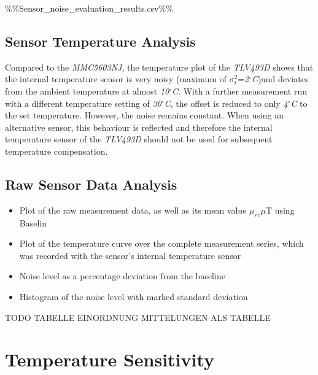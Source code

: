 \%\%Sensor\_noise\_evaluation\_results.csv\%\%

\hypertarget{sensor-temperature-analysis}{%
\subsection{Sensor Temperature
Analysis}\label{sensor-temperature-analysis}}

Compared to the \emph{MMC5603NJ}, the temperature plot of the
\emph{TLV493D} shows that the internal temperature sensor is very noisy
(maximum of \(\sigma^2_{t}\)=\emph{2\(^{\circ}\)C})and deviates from the
ambient temperature at almost \emph{10\(^{\circ}\)C}. With a further
measurement run with a different temperature setting of
\emph{30\(^{\circ}\)C}, the offset is reduced to only
\emph{4\(^{\circ}\)C} to the set temperature. However, the noise remains
constant. When using an alternative sensor, this behaviour is reflected
and therefore the internal temperature sensor of the \emph{TLV493D}
should not be used for subsequent temperature compensation.

\hypertarget{raw-sensor-data-analysis}{%
\subsection{Raw Sensor Data Analysis}\label{raw-sensor-data-analysis}}

\begin{itemize}
\tightlist
\item
  Plot of the raw measurement data, as well as its mean value
  \(\mu_{rv}\)\(\mu\)T using Baselin
\item
  Plot of the temperature curve over the complete measurement series,
  which was recorded with the sensor's internal temperature sensor
\item
  Noise level as a percentage deviation from the baseline
\item
  Histogram of the noise level with marked standard deviation
\end{itemize}

TODO TABELLE EINORDNUNG MITTELUNGEN ALS TABELLE

\hypertarget{temperature-sensitivity}{%
\section{Temperature Sensitivity}\label{temperature-sensitivity}}


